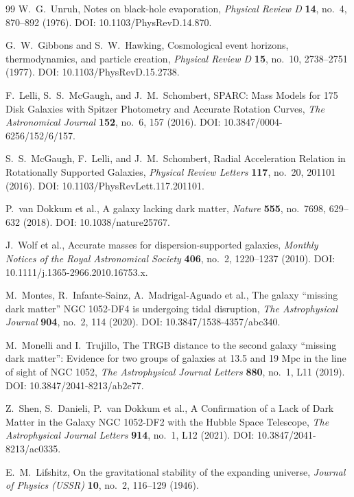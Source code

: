\begin{thebibliography}{99}
W.~G.~Unruh, Notes on black-hole evaporation, \textit{Physical Review D} \textbf{14}, no.~4, 870--892 (1976). DOI: 10.1103/PhysRevD.14.870.

G.~W.~Gibbons and S.~W.~Hawking, Cosmological event horizons, thermodynamics, and particle creation, \textit{Physical Review D} \textbf{15}, no.~10, 2738--2751 (1977). DOI: 10.1103/PhysRevD.15.2738.

F.~Lelli, S.~S.~McGaugh, and J.~M.~Schombert, SPARC: Mass Models for 175 Disk Galaxies with Spitzer Photometry and Accurate Rotation Curves, \textit{The Astronomical Journal} \textbf{152}, no.~6, 157 (2016). DOI: 10.3847/0004-6256/152/6/157.

S.~S.~McGaugh, F.~Lelli, and J.~M.~Schombert, Radial Acceleration Relation in Rotationally Supported Galaxies, \textit{Physical Review Letters} \textbf{117}, no.~20, 201101 (2016). DOI: 10.1103/PhysRevLett.117.201101.

P.~van Dokkum et al., A galaxy lacking dark matter, \textit{Nature} \textbf{555}, no.~7698, 629--632 (2018). DOI: 10.1038/nature25767.

J.~Wolf et al., Accurate masses for dispersion-supported galaxies, \textit{Monthly Notices of the Royal Astronomical Society} \textbf{406}, no.~2, 1220--1237 (2010). DOI: 10.1111/j.1365-2966.2010.16753.x.

M.~Montes, R.~Infante-Sainz, A.~Madrigal-Aguado et al., The galaxy ``missing dark matter'' NGC 1052-DF4 is undergoing tidal disruption, \textit{The Astrophysical Journal} \textbf{904}, no.~2, 114 (2020). DOI: 10.3847/1538-4357/abc340.

M.~Monelli and I.~Trujillo, The TRGB distance to the second galaxy ``missing dark matter'': Evidence for two groups of galaxies at 13.5 and 19 Mpc in the line of sight of NGC 1052, \textit{The Astrophysical Journal Letters} \textbf{880}, no.~1, L11 (2019). DOI: 10.3847/2041-8213/ab2e77.

Z.~Shen, S.~Danieli, P.~van Dokkum et al., A Confirmation of a Lack of Dark Matter in the Galaxy NGC 1052-DF2 with the Hubble Space Telescope, \textit{The Astrophysical Journal Letters} \textbf{914}, no.~1, L12 (2021). DOI: 10.3847/2041-8213/ac0335.

E.~M.~Lifshitz, On the gravitational stability of the expanding universe, \textit{Journal of Physics (USSR)} \textbf{10}, no.~2, 116--129 (1946).


\end{thebibliography}
